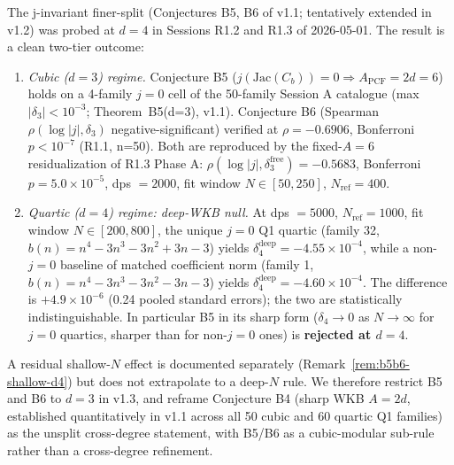 %

\begin{remark}\label{rem:b5b6-degree-stratification-r13}
The j-invariant finer-split (Conjectures B5, B6 of v1.1; tentatively
extended in v1.2) was probed at $d=4$ in Sessions R1.2 and R1.3
of 2026-05-01. The result is a clean two-tier outcome:
\begin{enumerate}
  \item \textit{Cubic ($d=3$) regime.}\;\;
        Conjecture B5 ($j(\mathrm{Jac}(C_b))=0 \Rightarrow
A_{\mathrm{PCF}}=2d=6$) holds on a 4-family $j=0$ cell of
        the 50-family Session A catalogue (max $|\delta_3|<10^{-3}$;
        Theorem~B5(d=3), v1.1). Conjecture B6 (Spearman
        $\rho(\log|j|, \delta_3)$ negative-significant) verified
        at $\rho=-0.6906$, Bonferroni $p<10^{-7}$ (R1.1, n=50). Both
        are reproduced by the fixed-$A=6$ residualization of R1.3
        Phase A: $\rho(\log|j|,\delta^{\mathrm{free}}_3) = -0.5683$,
        Bonferroni $p=5.0\times 10^{-5}$, dps $=2000$, fit window
        $N\in[50,250]$, $N_{\mathrm{ref}}=400$.
  \item \textit{Quartic ($d=4$) regime: deep-WKB null.}\;\;
        At dps $=5000$, $N_{\mathrm{ref}}=1000$, fit window
        $N\in[200,800]$, the unique $j=0$ Q1 quartic (family 32,
        $b(n)=n^4-3n^3-3n^2+3n-3$) yields
        $\delta^{\mathrm{deep}}_4 = -4.55\times 10^{-4}$, while a
        non-$j=0$ baseline of matched coefficient norm (family 1,
        $b(n)=n^4-3n^3-3n^2-3n-3$) yields
        $\delta^{\mathrm{deep}}_4 = -4.60\times 10^{-4}$.  The
        difference is $+4.9\times 10^{-6}$ (0.24 pooled standard
        errors); the two are statistically indistinguishable.  In
        particular B5 in its sharp form ($\delta_4\to 0$ as
        $N\to\infty$ for $j=0$ quartics, sharper than for non-$j=0$
        ones) is \textbf{rejected at $d=4$}.
\end{enumerate}

A residual shallow-$N$ effect is documented separately
(Remark~\ref{rem:b5b6-shallow-d4}) but does not extrapolate to a
deep-$N$ rule.  We therefore restrict B5 and B6 to $d=3$ in v1.3,
and reframe Conjecture B4 (sharp WKB $A=2d$, established
quantitatively in v1.1 across all 50 cubic and 60 quartic Q1
families) as the unsplit cross-degree statement, with B5/B6 as a
cubic-modular sub-rule rather than a cross-degree refinement.
\end{remark}

